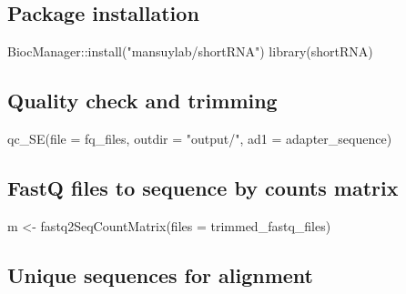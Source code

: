 \documentclass[12pt,twoside]{reedthesis}
\newenvironment{Shaded}{\begin{snugshade}}{\end{snugshade}}
\newcommand{\AttributeTok}[1]{\textcolor[rgb]{0.77,0.63,0.00}{#1}}
\newcommand{\FunctionTok}[1]{\textcolor[rgb]{0.00,0.00,0.00}{#1}}
\newcommand{\NormalTok}[1]{#1}
\newcommand{\OtherTok}[1]{\textcolor[rgb]{0.56,0.35,0.01}{#1}}
\newcommand{\SpecialCharTok}[1]{\textcolor[rgb]{0.00,0.00,0.00}{#1}}
\newcommand{\StringTok}[1]{\textcolor[rgb]{0.31,0.60,0.02}{#1}}
\begin{document}
\hypertarget{package-installation}{%
\subsection*{Package installation}\label{package-installation}}
\begin{Shaded}
\begin{Highlighting}[]
\NormalTok{BiocManager}\SpecialCharTok{::}\FunctionTok{install}\NormalTok{(}\StringTok{"mansuylab/shortRNA"}\NormalTok{)}
\FunctionTok{library}\NormalTok{(shortRNA)}
\end{Highlighting}
\end{Shaded}
\hypertarget{quality-check-and-trimming}{%
\subsection*{Quality check and trimming}\label{quality-check-and-trimming}}
\begin{Shaded}
\begin{Highlighting}[]
\FunctionTok{qc\_SE}\NormalTok{(}\AttributeTok{file =}\NormalTok{ fq\_files, }\AttributeTok{outdir =} \StringTok{"output/"}\NormalTok{, }\AttributeTok{ad1 =}\NormalTok{ adapter\_sequence)}
\end{Highlighting}
\end{Shaded}
\hypertarget{fastq-files-to-sequence-by-counts-matrix}{%
\subsection*{FastQ files to sequence by counts matrix}\label{fastq-files-to-sequence-by-counts-matrix}}
\begin{Shaded}
\begin{Highlighting}[]
\NormalTok{m }\OtherTok{\textless{}{-}} \FunctionTok{fastq2SeqCountMatrix}\NormalTok{(}\AttributeTok{files =}\NormalTok{ trimmed\_fastq\_files)}
\end{Highlighting}
\end{Shaded}
\hypertarget{unique-sequences-for-alignment}{%
\subsection*{Unique sequences for alignment}\label{unique-sequences-for-alignment}}
\end{document}
